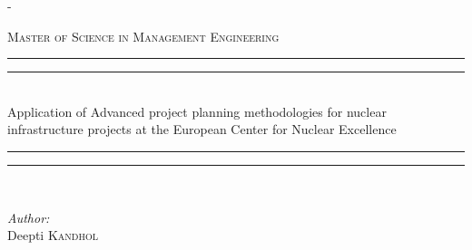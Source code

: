 %
%
% 
%
%
\begin{titlingpage}
\begin{SingleSpace}
\calccentering{\unitlength} 
\begin{adjustwidth*}{\unitlength}{-\unitlength}
\vspace*{6mm}
\begin{center}
\textsc{\Large Master of Science in Management Engineering }\\[0.5cm]
\rule[0.5ex]{\linewidth}{2pt}\vspace*{-\baselineskip}\vspace*{3.2pt}
\rule[0.5ex]{\linewidth}{1pt}\\[\baselineskip]
{\HUGE Application of Advanced project planning methodologies for nuclear infrastructure projects at the European Center for Nuclear Excellence }\\[4mm]
\rule[0.5ex]{\linewidth}{1pt}\vspace*{-\baselineskip}\vspace{3.2pt}
\rule[0.5ex]{\linewidth}{2pt}\\
\vspace{6.5mm}
\vspace{6.5mm}
\begin{minipage}{0.4\textwidth}
\begin{flushleft} \large
\emph{Author:}\\
Deepti \textsc{Kandhol}\\
\end{flushleft}
\end{minipage}
\begin{minipage}{0.4\textwidth}

\end{minipage}
\end{center}
\end{adjustwidth*}
\end{SingleSpace}
\end{titlingpage}
